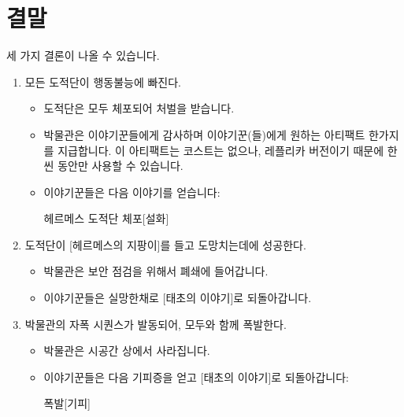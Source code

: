\documentclass{report}
\begin{document}
	\section*{결말}
	세 가지 결론이 나올 수 있습니다.
	\begin{enumerate}
		\item 모든 도적단이 행동불능에 빠진다.
		\begin{itemize}
			\item 도적단은 모두 체포되어 처벌을 받습니다.
			\item 박물관은 이야기꾼들에게 감사하며 이야기꾼(들)에게 원하는 아티팩트 한가지를 지급합니다. 이 아티팩트는 코스트는 없으나, 레플리카 버전이기 때문에 한 씬 동안만 사용할 수 있습니다.
			\item 이야기꾼들은 다음 이야기를 얻습니다:
			\begin{spoiler}{헤르메스 도적단 체포}{[설화]}
			\end{spoiler}
		\end{itemize}
		
		\item 도적단이 [헤르메스의 지팡이]를 들고 도망치는데에 성공한다.
		\begin{itemize}
			\item 박물관은 보안 점검을 위해서 폐쇄에 들어갑니다.
			\item 이야기꾼들은 실망한채로 [태초의 이야기]로 되돌아갑니다.
		\end{itemize}
		
		\item 박물관의 자폭 시퀀스가 발동되어, 모두와 함께 폭발한다.
		\begin{itemize}
			\item 박물관은 시공간 상에서 사라집니다.
			\item 이야기꾼들은 다음 기피증을 얻고 [태초의 이야기]로 되돌아갑니다:
			\begin{spoiler}{폭발}{[기피]}
				
				
			\end{spoiler}
		\end{itemize}
	\end{enumerate}
\end{document}
